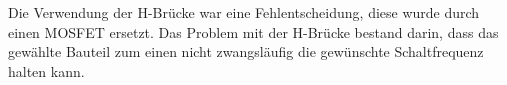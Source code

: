 Die Verwendung der H-Brücke war eine Fehlentscheidung, diese wurde durch einen MOSFET ersetzt. Das Problem mit der H-Brücke bestand darin, dass das gewählte Bauteil zum einen nicht zwangsläufig die gewünschte Schaltfrequenz halten kann.
